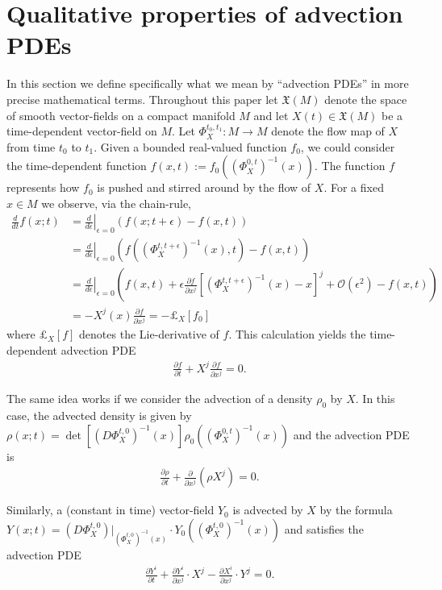 \documentclass[12pt]{amsart}
\newcommand{\pder}[2]{\ensuremath{\frac{ \partial #1}{\partial #2}}}
\begin{document}
\section{Qualitative properties of advection PDEs}
\label{sec:properties}
In this section we define specifically what we mean by ``advection PDEs'' in more precise mathematical terms.
Throughout this paper let $\mathfrak{X}(M)$ denote the space of smooth vector-fields on a compact manifold $M$
and let $X(t) \in \mathfrak{X}(M)$ be a time-dependent vector-field on $M$.
Let $\Phi^{t_{0},t_{1}}_{X}:M\to M$ denote the flow map of $X$ from time $t_{0}$ to $t_{1}$.
Given a bounded real-valued function $f_{0}$, we could consider the time-dependent function $f(x,t) := f_{0} ( (\Phi_{X}^{0,t})^{-1}(x) )$.
The function $f$ represents how $f_{0}$ is pushed and stirred around by the flow of $X$.
For a fixed $x \in M$ we observe, via the chain-rule,
\begin{align*}
	 \frac{d}{dt}  f(x;t) &=  \left. \frac{d}{d \epsilon} \right|_{\epsilon=0} ( f(x;t+\epsilon) - f(x,t) ) \\
	 &=  \left. \frac{d}{d \epsilon} \right|_{\epsilon=0} \left( f( (\Phi_{X}^{t,t+\epsilon})^{-1}(x) , t ) - f(x,t) \right) \\
	 &=  \left. \frac{d}{d \epsilon} \right|_{\epsilon=0} \left( f(x,t) + \epsilon \pder{f}{x^{j}} [ (\Phi_{X}^{t,t+\epsilon})^{-1}(x) - x ]^{j} + \mathcal{O}(\epsilon^{2}) - f(x,t) \right) \\
	 &= - X^{j}(x) \pder{f}{x^{j}} = - \pounds_{X}[f_{0}]
\end{align*}
where $\pounds_{X}[f]$ denotes the Lie-derivative of $f$.
This calculation yields the time-dependent advection PDE
\begin{align}\label{eq:function pde}
	\pder{f}{t} + X^{j} \pder{f}{x^{j}} = 0.
\end{align}

The same idea works if we consider the advection of a density $\rho_{0}$ by $X$.
In this case, the advected density is given by $\rho (x ; t) =  \det\left[ (D\Phi_{X}^{t,0})^{-1} (x) \right] \rho_{0}( (\Phi_{X}^{0,t})^{-1}(x) )$
and the advection PDE is
\begin{align} \label{eq:density pde}
	\pder{\rho}{t} + \pder{}{x^{j}} \left( \rho X^{j} \right) = 0.
\end{align}

Similarly, a (constant in time) vector-field $Y_{0}$ is advected by $X$ by the formula $Y(x ; t) =  (D\Phi_{X}^{t,0})|_{(\Phi_{X}^{t,0})^{-1}(x)} \cdot Y_{0}( (\Phi_{X}^{t,0})^{-1}(x))$
and satisfies the advection PDE
\begin{align} \label{eq:vector field pde}
	\pder{Y^{i}}{t} + \pder{Y^{i}}{x^{j}} \cdot X^{j} - \pder{X^{i}}{x^{j}} \cdot Y^{j} = 0.
\end{align}
\end{document}
